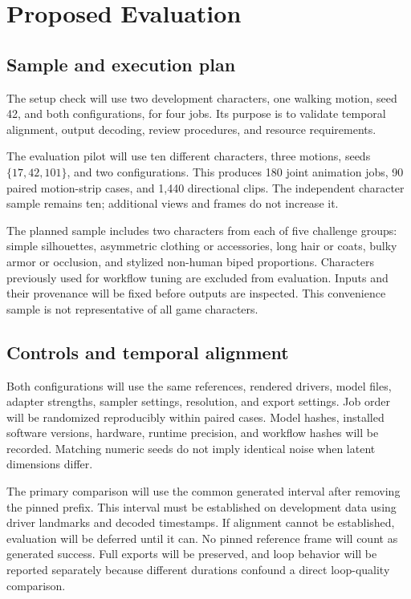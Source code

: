 \documentclass[11pt]{article}
\begin{document}
\section{Proposed Evaluation}
\subsection{Sample and execution plan}
The setup check will use two development characters, one walking motion, seed 42, and both configurations, for four jobs. Its purpose is to validate temporal alignment, output decoding, review procedures, and resource requirements.

The evaluation pilot will use ten different characters, three motions, seeds $\{17,42,101\}$, and two configurations. This produces 180 joint animation jobs, 90 paired motion-strip cases, and 1,440 directional clips. The independent character sample remains ten; additional views and frames do not increase it.

The planned sample includes two characters from each of five challenge groups: simple silhouettes, asymmetric clothing or accessories, long hair or coats, bulky armor or occlusion, and stylized non-human biped proportions. Characters previously used for workflow tuning are excluded from evaluation. Inputs and their provenance will be fixed before outputs are inspected. This convenience sample is not representative of all game characters.

\subsection{Controls and temporal alignment}
Both configurations will use the same references, rendered drivers, model files, adapter strengths, sampler settings, resolution, and export settings. Job order will be randomized reproducibly within paired cases. Model hashes, installed software versions, hardware, runtime precision, and workflow hashes will be recorded. Matching numeric seeds do not imply identical noise when latent dimensions differ.

The primary comparison will use the common generated interval after removing the pinned prefix. This interval must be established on development data using driver landmarks and decoded timestamps. If alignment cannot be established, evaluation will be deferred until it can. No pinned reference frame will count as generated success. Full exports will be preserved, and loop behavior will be reported separately because different durations confound a direct loop-quality comparison.
\end{document}

